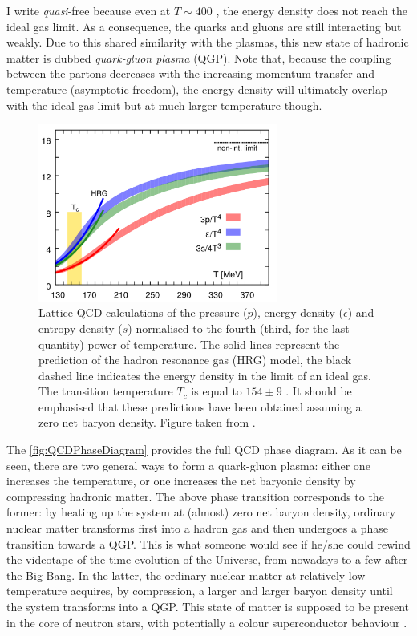 I write \textit{quasi}-free because even at $T \sim 400 $ \mev, the energy density does not reach the ideal gas limit. As a consequence, the quarks and gluons are still interacting but weakly. Due to this shared similarity with the plasmas, this new state of hadronic matter is dubbed \textit{quark-gluon plasma} (QGP). Note that, because the coupling between the partons decreases with the increasing momentum transfer and temperature (asymptotic freedom), the energy density will ultimately overlap with the ideal gas limit but at much larger temperature though. \\

\begin{figure}[h]
	\centering
	\includegraphics[width=0.7\textwidth]{Figs/Chapter2/Pressure_energy_entropy.png}
	\caption{Lattice QCD calculations of the pressure ($p$), energy density ($\epsilon$) and entropy density ($s$) normalised to the fourth (third, for the last quantity) power of temperature. The solid lines represent the prediction of the hadron resonance gas (HRG) model, the black dashed line indicates the energy density in the limit of an ideal gas. The transition temperature $T_{c}$ is equal to $154 \pm 9$ \mev. It should be emphasised that these predictions have been obtained assuming a zero net baryon density. Figure taken from \cite{bazavovEquationStateFlavor2014}.}
	\label{fig:QCDEnergyDensity}
\end{figure}

The \fig\ref{fig:QCDPhaseDiagram} provides the full QCD phase diagram. As it can be seen, there are two general ways to form a quark-gluon plasma: either one increases the temperature, or one increases the net baryonic density by compressing hadronic matter. The above phase transition corresponds to the former: by heating up the system at (almost) zero net baryon density, ordinary nuclear matter transforms first into a hadron gas and then undergoes a phase transition towards a QGP. This is what someone would see if he/she could rewind the videotape of the time-evolution of the Universe, from nowadays to a few \musec after the Big Bang. In the latter, the ordinary nuclear matter at relatively low temperature acquires, by compression, a larger and larger baryon density until the system transforms into a QGP. This state of matter is supposed to be present in the core of neutron stars\cite{annalaEvidenceQuarkmatterCores2019}, with potentially a colour superconductor behaviour \cite{alfordQCDFiniteBaryon1998}.

